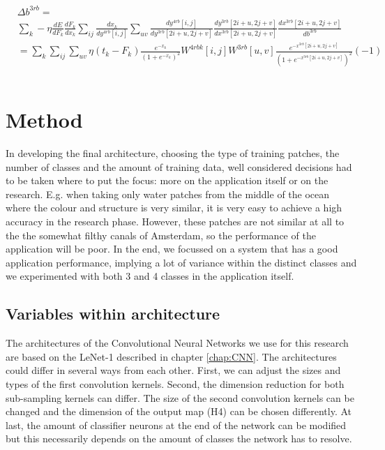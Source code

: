 \documentclass[a4paper,onecolumn]{report}
\begin{document}
\begin{small}
\begin{equation}
\begin{split}
	&\Delta b^{3rb} =\\
	&\sum_{k} - \eta  \frac{dE}{dF_{k}} 
	\frac{dF_{k}}{dx_{k}} 
	\sum_{ij} \frac{dx_{k}}{dy^{4rb}[i,j]} 
	\sum_{uv}\frac{dy^{4rb}[i,j]}{d y^{3rb} [2i+u,2j+v]} 
	\frac{d y^{3rb} [2i+u,2j+v]}{d x^{3rb}[2i+u,2j+v]}
	\frac{d x^{3rb}[2i+u,2j+v]}{d b^{3rb}} \\
	&=\sum_{k} \sum_{ij} \sum_{uv} \eta (t_{k}-F_{k})\frac{e^{-x_{k}}}{(1+e^{-x_{k}})^{2}} W^{4rbk}[i,j]  W^{3rb}[u,v] \frac{e^{-x^{3rb}[2i+u,2j+v]}}{(1+e^{-x^{3rb}[2i+u,2j+v]})^2} (-1)
\end{split}
\end{equation}
\end{small}
\begin{small}
\begin{equation}
\end{equation}
\end{small}


\chapter{Method}
\label{chap:method}
In developing the final architecture, choosing the type of training patches, the number of classes and the amount of training data, well considered decisions had to be taken where to put the focus: more on the application itself or on the research. E.g. when taking only water patches from the middle of the ocean where the colour and structure is very similar, it is very easy to achieve a high accuracy in the research phase. However, these patches are not similar at all to the the somewhat filthy canals of Amsterdam, so the performance of the application will be poor. In the end, we focussed on a system that has a good application performance, implying a lot of variance within the distinct classes and we experimented with both 3 and 4 classes in the application itself. 

\section{Variables within architecture}
The architectures of the Convolutional Neural Networks we use for this research are based on the LeNet-1 described in chapter \ref{chap:CNN}. The architectures could differ in several ways from each other. First, we can adjust the sizes and types of the first convolution kernels. Second, the dimension reduction for both sub-sampling kernels can differ. The size of the second convolution kernels can be changed and the dimension of the output map (H4) can be chosen differently. At last, the amount of classifier neurons at the end of the network can be modified but this necessarily depends on the amount of classes the network has to resolve. 
\end{document}
